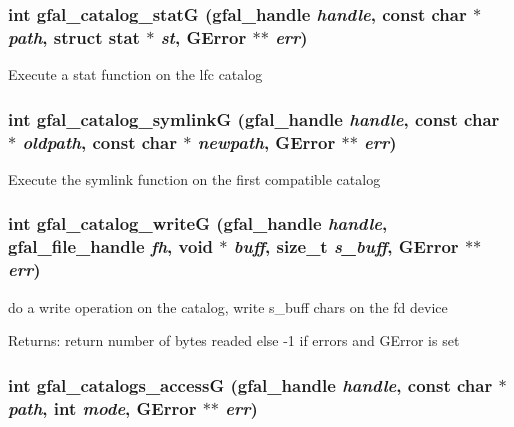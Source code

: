 \subsubsection{\setlength{\rightskip}{0pt plus 5cm}int gfal\_\-catalog\_\-stat\-G (gfal\_\-handle {\em handle}, const char $\ast$ {\em path}, struct stat $\ast$ {\em st}, GError $\ast$$\ast$ {\em err})}\label{gfal__common__catalog_8c_28ca68c00e4a67bc158975ef3e4f8013}


Execute a stat function on the lfc catalog 
\subsubsection{\setlength{\rightskip}{0pt plus 5cm}int gfal\_\-catalog\_\-symlink\-G (gfal\_\-handle {\em handle}, const char $\ast$ {\em oldpath}, const char $\ast$ {\em newpath}, GError $\ast$$\ast$ {\em err})}\label{gfal__common__catalog_8c_b4055bd8f8a33a10ef7a5814a0c1e1bf}


Execute the symlink function on the first compatible catalog 
\subsubsection{\setlength{\rightskip}{0pt plus 5cm}int gfal\_\-catalog\_\-write\-G (gfal\_\-handle {\em handle}, gfal\_\-file\_\-handle {\em fh}, void $\ast$ {\em buff}, size\_\-t {\em s\_\-buff}, GError $\ast$$\ast$ {\em err})}\label{gfal__common__catalog_8c_e9c3e214dbb01960295148aa66c42cb8}


do a write operation on the catalog, write s\_\-buff chars on the fd device \begin{Desc}
\item[Returns:]return number of bytes readed else -1 if errors and GError is set \end{Desc}
\subsubsection{\setlength{\rightskip}{0pt plus 5cm}int gfal\_\-catalogs\_\-access\-G (gfal\_\-handle {\em handle}, const char $\ast$ {\em path}, int {\em mode}, GError $\ast$$\ast$ {\em err})}\label{gfal__common__catalog_8c_4fd85b35f2134b73207c12b54e85959d}


